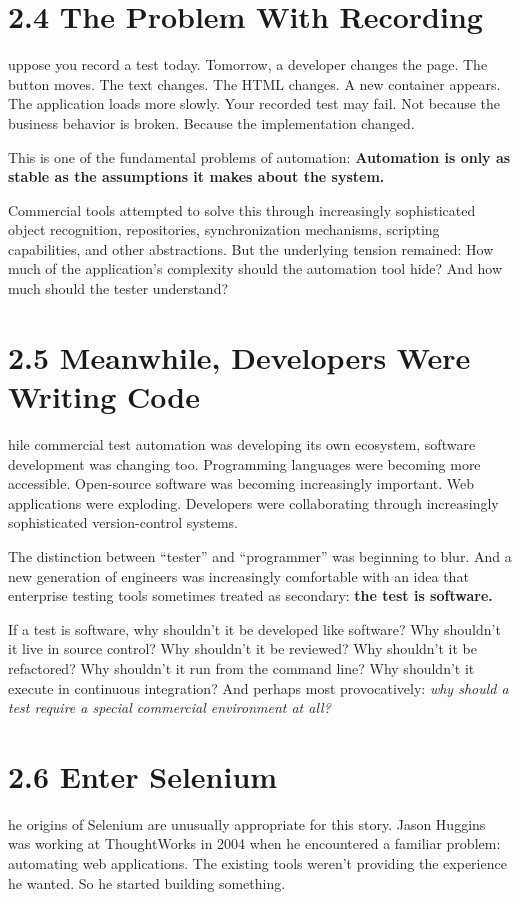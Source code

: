 \documentclass[11pt, a4paper, openany]{book}
\newcommand{\initialcap}[1]{{\fontfamily{lmss}\selectfont\huge\textbf{#1}}}
\begin{document}
\section{2.4 The Problem With Recording}
\noindent \initialcap{S}uppose you record a test today. Tomorrow, a developer changes the page. The button moves. The text changes. The HTML changes. A new container appears. The application loads more slowly. Your recorded test may fail. Not because the business behavior is broken. Because the implementation changed.

This is one of the fundamental problems of automation: \textbf{Automation is only as stable as the assumptions it makes about the system.}

Commercial tools attempted to solve this through increasingly sophisticated object recognition, repositories, synchronization mechanisms, scripting capabilities, and other abstractions. But the underlying tension remained: How much of the application's complexity should the automation tool hide? And how much should the tester understand?

\section{2.5 Meanwhile, Developers Were Writing Code}
\noindent \initialcap{W}hile commercial test automation was developing its own ecosystem, software development was changing too. Programming languages were becoming more accessible. Open-source software was becoming increasingly important. Web applications were exploding. Developers were collaborating through increasingly sophisticated version-control systems.

The distinction between ``tester'' and ``programmer'' was beginning to blur. And a new generation of engineers was increasingly comfortable with an idea that enterprise testing tools sometimes treated as secondary: \textbf{the test is software.}

If a test is software, why shouldn't it be developed like software? Why shouldn't it live in source control? Why shouldn't it be reviewed? Why shouldn't it be refactored? Why shouldn't it run from the command line? Why shouldn't it execute in continuous integration? And perhaps most provocatively: \textit{why should a test require a special commercial environment at all?}

\section{2.6 Enter Selenium}
\noindent \initialcap{T}he origins of Selenium are unusually appropriate for this story. Jason Huggins was working at ThoughtWorks in 2004 when he encountered a familiar problem: automating web applications. The existing tools weren't providing the experience he wanted. So he started building something.
\end{document}
